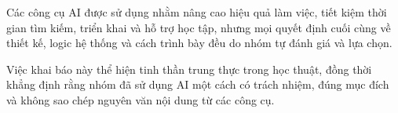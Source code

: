 Các công cụ AI được sử dụng nhằm nâng cao hiệu quả làm việc, tiết kiệm thời gian tìm kiếm, triển khai và hỗ trợ học tập, nhưng mọi quyết định cuối cùng về thiết kế, logic hệ thống và cách trình bày đều do nhóm tự đánh giá và lựa chọn.

Việc khai báo này thể hiện tinh thần trung thực trong học thuật, đồng thời khẳng định rằng nhóm đã sử dụng AI một cách có trách nhiệm, đúng mục đích và không sao chép nguyên văn nội dung từ các công cụ.